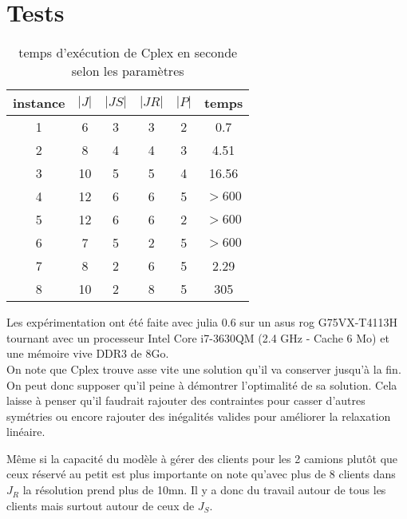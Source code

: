 \documentclass[12pt,a4paper,fleqn]{article}
\begin{document}
\section{Tests}

\begin{table}[!h]
\centering
\begin{tabular}{|*{6}{c|}}
  \hline
  instance & $|J|$ & $|JS|$ & $|JR|$ & $|P|$ & temps \\
  \hline
  1 & 6 & 3 & 3 & 2 & 0.7 \\
  2 & 8 & 4 & 4 & 3 & 4.51 \\
  3 & 10 & 5 & 5 & 4 & 16.56 \\
  4 & 12 & 6 & 6 & 5 & $>600$ \\
  5 & 12 & 6 & 6 & 2 & $>600$ \\
  6 & 7  & 5 & 2 & 5 & $>600$\\
  7 & 8  & 2 & 6 & 5 & 2.29 \\
  8 & 10 & 2 & 8 & 5 & 305 \\
  \hline
\end{tabular}
\caption{temps d’exécution de Cplex en seconde selon les paramètres}
\label{temps d'execution}
\end{table}

Les expérimentation ont été faite avec julia 0.6 sur un asus rog G75VX-T4113H tournant avec un processeur Intel Core i7-3630QM (2.4 GHz - Cache 6 Mo) et une mémoire vive DDR3 de 8Go.\\

On note que Cplex trouve asse vite une solution qu'il va conserver jusqu’à la fin. On peut donc supposer qu'il peine à démontrer l'optimalité de sa solution. Cela laisse à penser qu'il faudrait rajouter des contraintes pour casser d'autres symétries ou encore rajouter des inégalités valides pour améliorer la relaxation linéaire.

Même si la capacité du modèle à gérer des clients pour les 2 camions plutôt que ceux réservé au petit est plus importante on note qu'avec plus de 8 clients dans $J_R$ la résolution prend plus de 10mn. Il y a donc du travail autour de tous les clients mais surtout autour de ceux de $J_S$.
\end{document}
